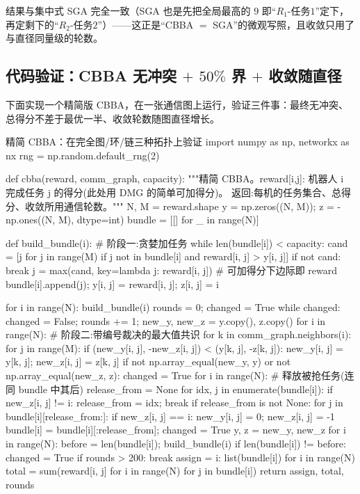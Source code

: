 结果与集中式 SGA 完全一致（SGA 也是先把全局最高的 $9$ 即“$R_1$-任务$1$”定下，再定剩下的“$R_2$-任务$2$”）——这正是“CBBA $=$ SGA”的微观写照，且收敛只用了与直径同量级的轮数。

\subsection{代码验证：CBBA 无冲突 $+$ $50\%$ 界 $+$ 收敛随直径}
\label{sec:mapf-cbba-code}

下面实现一个精简版 CBBA，在一张通信图上运行，验证三件事：最终无冲突、总得分不差于最优一半、收敛轮数随图直径增长。

\begin{codebox}[Python]{精简 CBBA：在完全图/环/链三种拓扑上验证}
import numpy as np, networkx as nx
rng = np.random.default_rng(2)

def cbba(reward, comm_graph, capacity):
    """精简 CBBA。reward[i,j]: 机器人 i 完成任务 j 的得分(此处用 DMG 的简单可加得分)。
    返回:每机的任务集合、总得分、收敛所用通信轮数。"""
    N, M = reward.shape
    y = np.zeros((N, M)); z = -np.ones((N, M), dtype=int)
    bundle = [[] for _ in range(N)]

    def build_bundle(i):                                   # 阶段一:贪婪加任务
        while len(bundle[i]) < capacity:
            cand = [j for j in range(M) if j not in bundle[i] and reward[i, j] > y[i, j]]
            if not cand: break
            j = max(cand, key=lambda j: reward[i, j])      # 可加得分下边际即 reward
            bundle[i].append(j); y[i, j] = reward[i, j]; z[i, j] = i

    for i in range(N): build_bundle(i)
    rounds = 0; changed = True
    while changed:
        changed = False; rounds += 1; new_y, new_z = y.copy(), z.copy()
        for i in range(N):                                 # 阶段二:带编号裁决的最大值共识
            for k in comm_graph.neighbors(i):
                for j in range(M):
                    if (new_y[i, j], -new_z[i, j]) < (y[k, j], -z[k, j]):
                        new_y[i, j] = y[k, j]; new_z[i, j] = z[k, j]
        if not np.array_equal(new_y, y) or not np.array_equal(new_z, z): changed = True
        for i in range(N):                                 # 释放被抢任务(连同 bundle 中其后)
            release_from = None
            for idx, j in enumerate(bundle[i]):
                if new_z[i, j] != i: release_from = idx; break
            if release_from is not None:
                for j in bundle[i][release_from:]:
                    if new_z[i, j] == i: new_y[i, j] = 0; new_z[i, j] = -1
                bundle[i] = bundle[i][:release_from]; changed = True
        y, z = new_y, new_z
        for i in range(N):
            before = len(bundle[i]); build_bundle(i)
            if len(bundle[i]) != before: changed = True
        if rounds > 200: break
    assign = {i: list(bundle[i]) for i in range(N)}
    total = sum(reward[i, j] for i in range(N) for j in bundle[i])
    return assign, total, rounds


\end{codebox}
